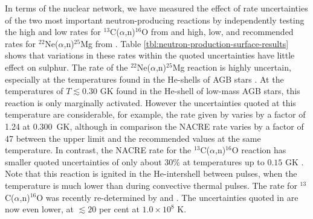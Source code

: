 In terms of the nuclear network, we have measured the effect of rate uncertainties of the two most important neutron-producing reactions by independently testing the high and low rates for $^{13}$C($\alpha$,n)$^{16}$O from \citet[][NACRE collaboration]{Angulo:1999kp} and high, low, and recommended rates for $^{22}$Ne($\alpha$,n)$^{25}$Mg from \citet{Iliadis:2010eu}. Table \ref{tbl:neutron-production-surface-results} shows that variations in these rates within the quoted uncertainties have little effect on sulphur.
The rate of the $^{22}$Ne($\alpha$,n)$^{25}$Mg reaction is highly
uncertain, especially at the temperatures found in the He-shells
of AGB stars \citep[e.g., see discussions
in][]{Longland:2009dp,Longland:2012ix,Wiescher:2012is}. At the temperatures 
of $T \lesssim 0.30$ GK found in the He-shell of low-mass
AGB stars, this reaction is only marginally activated. However the
uncertainties quoted at this temperature are considerable, for
example, the rate given by \citet{Iliadis:2010eu} varies by a factor of 1.24 at 0.300~GK,
although in comparison the NACRE rate varies by a factor of 47
between the upper limit and the recommended values at the same temperature. In contrast, the NACRE rate
for the $^{13}$C($\alpha$,n)$^{16}$O reaction has smaller quoted uncertainties of only about 30\% 
at temperatures up to $0.15$ GK \citep[][NACRE collaboration]{Angulo:1999kp}. Note that this
reaction is ignited in the He-intershell between pulses, when the temperature
is much lower than during convective thermal pulses.
The rate for $^{13}$C($\alpha$,n)$^{16}$O was recently re-determined by \citet{Pellegriti:2008ii} and \citet{Guo:2012ck}.
The uncertainties quoted in \citet{Guo:2012ck} are now even lower, at $\lesssim 20$ per cent at 
$1.0 \times 10^{8}$ K.

